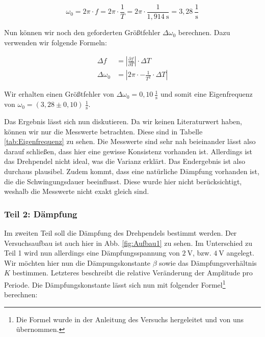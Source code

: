             \begin{equation}
                \omega_{0} = 2 \pi \cdot f = 2 \pi \cdot \frac{1}{T} = 2 \pi \cdot \frac{1}{1,914\ \mathrm{s}} = 3,28\ \frac{1}{\mathrm{s}}
                \label{eq:Eigenfrequenz}
            \end{equation}

            Nun können wir noch den geforderten Größtfehler $\Delta \omega_{0}$ berechnen. Dazu verwenden wir folgende Formeln:

            \begin{equation}
                \begin{aligned}
                \Delta f &= \left| \frac{\partial f}{\partial T} \right| \cdot \Delta T\\
                \Delta \omega_{0} &= \left|2 \pi \cdot -\frac{1}{T^{2}} \cdot \Delta T\right|
                \end{aligned}
                \label{eq:Größtfehler}
            \end{equation}

            Wir erhalten einen Größtfehler von $\Delta \omega_{0} = 0,10\ \frac{1}{\mathrm{s}}$ und somit eine Eigenfrequenz von $\omega_{0} = (3,28 \pm 0,10)\ \frac{1}{\mathrm{s}}$.

            Das Ergebnis lässt sich nun diskutieren. Da wir keinen Literaturwert haben, können wir nur die Messwerte betrachten. Diese sind in Tabelle \ref{tab:Eigenfrequenz} zu sehen. Die Messwerte sind sehr nah beieinander lässt also darauf schließen, dass hier eine gewisse Konsistenz vorhanden ist. Allerdings ist das Drehpendel nicht ideal, was die Varianz erklärt. Das Endergebnis ist also durchaus plausibel. Zudem kommt, dass eine natürliche Dämpfung vorhanden ist, die die Schwingungsdauer beeinflusst. Diese wurde hier nicht berücksichtigt, weshalb die Messwerte nicht exakt gleich sind.

        \subsubsection{Teil 2: Dämpfung}
        
            Im zweiten Teil soll die Dämpfung des Drehpendels bestimmt werden. Der Versuchsaufbau ist auch hier in Abb. \ref{fig:Aufbau1} zu sehen. Im Unterschied zu Teil 1 wird nun allerdings eine Dämpfungsspannung von $2\ \mathrm{V}$, bzw. $4\ \mathrm{V}$ angelegt. Wir möchten hier nun die Dämpungskonstante $\beta$ sowie das Dämpfungsverhältnis $K$ bestimmen. Letzteres beschreibt die relative Veränderung der Amplitude pro Periode. Die Dämpfungskonstante lässt sich nun mit folgender Formel\footnote[1]{Die Formel wurde in der Anleitung des Versuchs hergeleitet und von uns übernommen.} berechnen:


